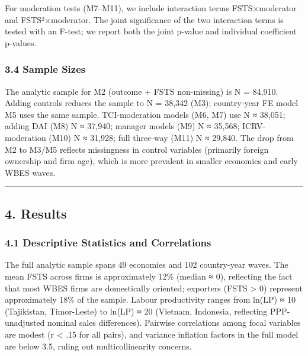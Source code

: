 \documentclass[12pt,a4paper]{article}
\begin{document}
For moderation tests (M7--M11), we include interaction terms
FSTS×moderator and FSTS²×moderator. The joint significance of the two
interaction terms is tested with an F-test; we report both the joint
p-value and individual coefficient p-values.

\hypertarget{34-sample-sizes}{%
\subsubsection{3.4 Sample Sizes}\label{34-sample-sizes}}

The analytic sample for M2 (outcome + FSTS non-missing) is N = 84,910.
Adding controls reduces the sample to N = 38,342 (M3); country-year FE
model M5 uses the same sample. TCI-moderation models (M6, M7) use N ≈
38,051; adding DAI (M8) N ≈ 37,940; manager models (M9) N ≈ 35,568;
ICRV-moderation (M10) N ≈ 31,928; full three-way (M11) N ≈ 29,840. The
drop from M2 to M3/M5 reflects missingness in control variables
(primarily foreign ownership and firm age), which is more prevalent in
smaller economies and early WBES waves.

\begin{center}\rule{0.5\linewidth}{0.5pt}\end{center}

\hypertarget{4-results}{%
\subsection{4. Results}\label{4-results}}

\hypertarget{41-descriptive-statistics-and-correlations}{%
\subsubsection{4.1 Descriptive Statistics and
Correlations}\label{41-descriptive-statistics-and-correlations}}

The full analytic sample spans 49 economies and 102 country-year waves.
The mean FSTS across firms is approximately 12\% (median ≈ 0),
reflecting the fact that most WBES firms are domestically oriented;
exporters (FSTS \textgreater{} 0) represent approximately 18\% of the
sample. Labour productivity ranges from ln(LP) ≈ 10 (Tajikistan,
Timor-Leste) to ln(LP) ≈ 20 (Vietnam, Indonesia, reflecting
PPP-unadjusted nominal sales differences). Pairwise correlations among
focal variables are modest (\textbar r\textbar{} \textless{} .15 for all
pairs), and variance inflation factors in the full model are below 3.5,
ruling out multicollinearity concerns.
\end{document}
